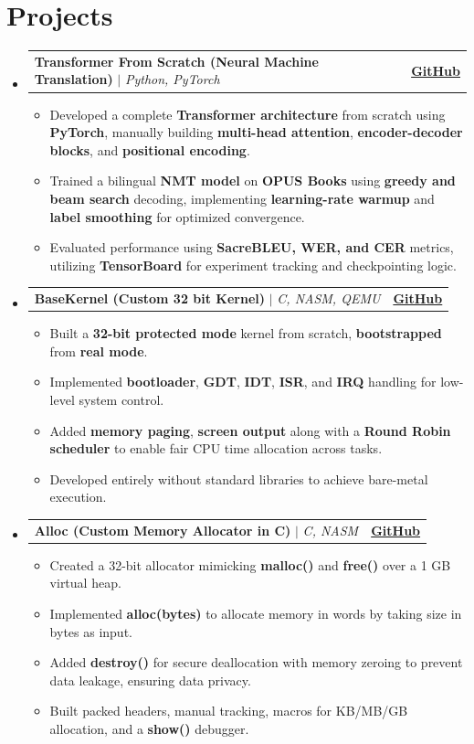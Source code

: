 \documentclass[letterpaper,11pt]{article}
\makeatletter
\newcommand{\resumeItem}[1]{
  \item\small{
    {#1 \vspace{-3pt}}
  }
}
\newcommand{\resumeProjectHeading}[2]{ 
    \item
    \begin{tabular*}{1.001\textwidth}{l@{\extracolsep{\fill}}r}
      \small#1 & \textbf{\small #2}\\
    \end{tabular*}\vspace{-8pt}
} %
\newcommand{\resumeSubHeadingListStart}{\begin{itemize}[leftmargin=0.0in, label={}]}
\newcommand{\resumeSubHeadingListEnd}{\end{itemize}}
\newcommand{\resumeItemListStart}{\begin{itemize}}
\newcommand{\resumeItemListEnd}{\end{itemize}\vspace{-9pt}}
\makeatother
\begin{document}
\section{Projects}
    \vspace{-5pt}
    \resumeSubHeadingListStart
        \resumeProjectHeading
            {\textbf{\normalsize{Transformer From Scratch (Neural Machine Translation)}} $|$ \emph{Python, PyTorch}}{\href{https://github.com/ankushhKapoor/transformer-from-scratch}{GitHub}}
            \resumeItemListStart
               \resumeItem{Developed a complete \textbf{Transformer architecture} from scratch using \textbf{PyTorch}, manually building \textbf{multi-head attention}, \textbf{encoder-decoder blocks}, and \textbf{positional encoding}.}
                \resumeItem{Trained a bilingual \textbf{NMT model} on \textbf{OPUS Books} using \textbf{greedy and beam search} decoding, implementing \textbf{learning-rate warmup} and \textbf{label smoothing} for optimized convergence.}
                \resumeItem{Evaluated performance using \textbf{SacreBLEU, WER, and CER} metrics, utilizing \textbf{TensorBoard} for experiment tracking and checkpointing logic.}
            \resumeItemListEnd
        \vspace{-13pt}


        \resumeProjectHeading
            {\textbf{\normalsize{BaseKernel (Custom 32 bit Kernel)}} $|$ \emph{C, NASM, QEMU}}{\href{https://github.com/ankushhKapoor/BaseKernel}{GitHub}}
            \resumeItemListStart
                \resumeItem{Built a \textbf{32-bit protected mode} kernel from scratch, \textbf{bootstrapped} from \textbf{real mode}.}
            \resumeItem{Implemented \textbf{bootloader}, \textbf{GDT}, \textbf{IDT}, \textbf{ISR}, and \textbf{IRQ} handling for low-level system control.}
                \resumeItem{Added \textbf{memory paging}, \textbf{screen output} along with a \textbf{Round Robin scheduler} to enable fair CPU time allocation across tasks.}
                \resumeItem{Developed entirely without standard libraries to achieve bare-metal execution.}
            \resumeItemListEnd
        \vspace{-13pt}

        \resumeProjectHeading
            {\textbf{\normalsize{Alloc (Custom Memory Allocator in C)}} $|$ \emph{C, NASM}}{\href{https://github.com/ankushhKapoor/alloc}{GitHub}}
            \resumeItemListStart
        \resumeItem{Created a 32-bit allocator mimicking \textbf{malloc()} and \textbf{free()} over a 1 GB virtual heap.}
                \resumeItem{Implemented \textbf{alloc(bytes)} to allocate memory in words by taking size in bytes as input.}
                \resumeItem{Added \textbf{destroy()} for secure deallocation with memory zeroing to prevent data leakage, ensuring data privacy.}
                \resumeItem{Built packed headers, manual tracking, macros for KB/MB/GB allocation, and a \textbf{show()} debugger.}
            \resumeItemListEnd
        \resumeSubHeadingListEnd
        \vspace{-14pt}
    
\end{document}
